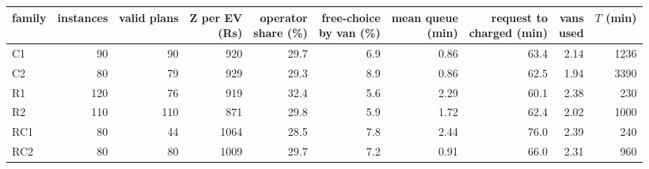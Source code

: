 \begin{tabular}{@{}lrrrrrrrrr@{}}
\toprule
family & instances & valid plans & \shortstack[r]{Z per EV\\(Rs)} & \shortstack[r]{operator\\share (\%)} & \shortstack[r]{free-choice\\by van (\%)} & \shortstack[r]{mean queue\\(min)} & \shortstack[r]{request to\\charged (min)} & \shortstack[r]{vans\\used} & $T$ (min) \\
\midrule
C1 & 90 & 90 & 920 & 29.7 & 6.9 & 0.86 & 63.4 & 2.14 & 1236 \\
C2 & 80 & 79 & 929 & 29.3 & 8.9 & 0.86 & 62.5 & 1.94 & 3390 \\
R1 & 120 & 76 & 919 & 32.4 & 5.6 & 2.29 & 60.1 & 2.38 & 230 \\
R2 & 110 & 110 & 871 & 29.8 & 5.9 & 1.72 & 62.4 & 2.02 & 1000 \\
RC1 & 80 & 44 & 1064 & 28.5 & 7.8 & 2.44 & 76.0 & 2.39 & 240 \\
RC2 & 80 & 80 & 1009 & 29.7 & 7.2 & 0.91 & 66.0 & 2.31 & 960 \\
\bottomrule
\end{tabular}
